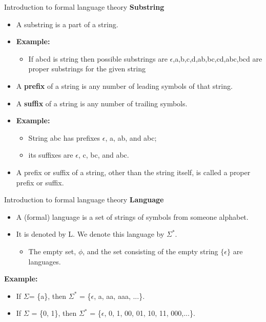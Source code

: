 \documentclass{beamer}
\begin{document}
\begin{frame}{Introduction to formal language theory}
	\textbf{Substring}
	\begin{itemize}
		\item A substring is a part of a string.
		\item \textbf{Example:}
		\begin{itemize}
			\item If abcd is string then possible substrings are $\epsilon$,a,b,c,d,ab,bc,cd,abc,bcd 
			are proper substrings for the given string
		\end{itemize}
	\item A \textbf{prefix} of a string is any number of leading symbols of that string.
	\item A \textbf{suffix} of a string is any number of trailing symbols.
	\item \textbf{Example:}
	\begin{itemize}
		\item String abc has prefixes $\epsilon$, a, ab, and abc;
		\item its suffixes are $\epsilon$, c, bc, and abc.
	\end{itemize}
\item A prefix or suffix of a string, other than the string itself, is called a 
proper prefix or suffix.
	\end{itemize}
\end{frame}
\begin{frame}{Introduction to formal language theory}
	\textbf{Language}
	\begin{itemize}
		\item A (formal) language is a set of strings of symbols from someone alphabet.
		\item It is denoted by L. We denote this language by $\Sigma^*$.
		\begin{itemize}
		\item The empty set, $\phi$, and the set consisting of the empty string $\{\epsilon\}$ are 
		languages.
		\end{itemize}
	\end{itemize}
\textbf{Example:}
\begin{itemize}
	\item If $\Sigma$= \{a\}, then $\Sigma^*$ = \{$\epsilon$, a, aa, aaa, ...\}. 
	\item If  $\Sigma$ = \{0, 1\}, then $\Sigma^*$ = \{$\epsilon$, 0, 1, 00, 01, 10, 11, 000,...\}.
\end{itemize}
\end{frame}
\end{document}
